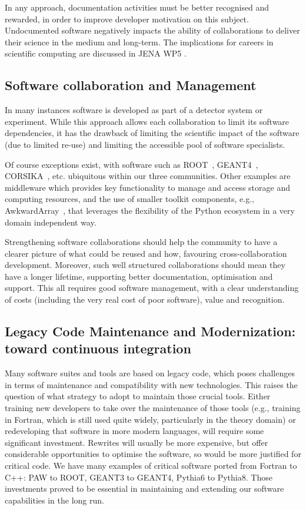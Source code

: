 In any approach, documentation activities must be better recognised and rewarded, in order to improve developer motivation on this subject.  Undocumented software negatively impacts the ability of collaborations to deliver their science in the medium and long-term.  The implications for careers in scientific computing are discussed in JENA WP5 \cite{JENA_WG_Reports}.


\subsection{Software collaboration and Management}


In many instances software is developed as part of a detector system or experiment. While this approach allows each collaboration to limit its software dependencies, it has the drawback of limiting the scientific impact of the software (due to limited re-use) and limiting the accessible pool of software specialists.

Of course exceptions exist, with software such as ROOT~\cite{Brun1996}, GEANT4~\cite{Agostinelli2003}, CORSIKA~\cite{Heck:1998vt}, etc. ubiquitous within our three communities. Other examples are middleware which provides key functionality to manage and access storage and computing resources, and the use of smaller toolkit components, e.g., AwkwardArray~\cite{Pivarski_Awkward_Array_2018}, that leverages the flexibility of the Python ecosystem in a very domain independent way.

Strengthening software collaborations should help the community to have a clearer picture of what could be reused and how, favouring cross-collaboration development. Moreover, such well structured collaborations should mean they have a longer lifetime, supporting better documentation, optimisation and support. This all requires good software management, with a clear understanding of costs (including the very real cost of poor software), value and recognition.


\subsection{Legacy Code Maintenance and Modernization: toward continuous integration}

Many software suites and tools are based on legacy code, which poses challenges in terms of maintenance and compatibility with new technologies. This raises the question of what strategy to adopt to maintain those crucial tools. Either training new developers to take over the maintenance of those tools (e.g., training in Fortran, which is still used quite widely, particularly in the theory domain) or redeveloping that software in more modern languages, will require some significant investment. Rewrites will usually be more expensive, but offer considerable opportunities to optimise the software, so would be more justified for critical code. We have many examples of critical software ported from Fortran to C++: PAW to ROOT, GEANT3 to GEANT4, Pythia6 to Pythia8. Those investments proved to be essential in maintaining and extending our software capabilities in the long run.


